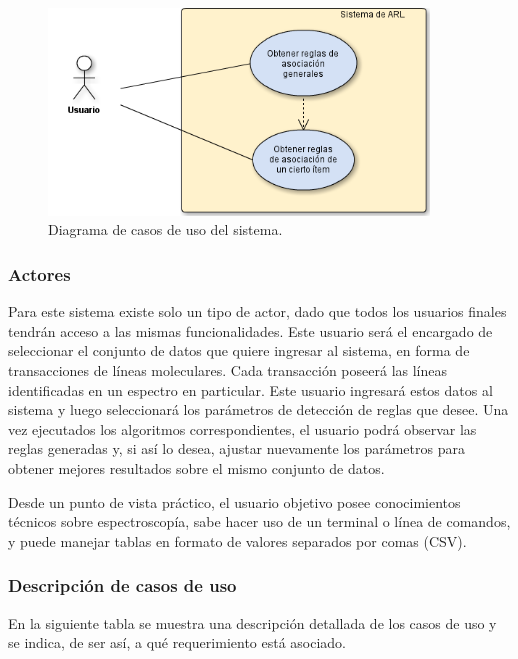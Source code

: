 \begin{figure}[h!]
\begin{center}
\includegraphics[width=0.9\textwidth]{imagenes/casos_de_uso.png}
\end{center}
\vspace*{-5mm}
\caption{Diagrama de casos de uso del sistema.}
\label{fig:cases}
\end{figure}

\subsubsection{Actores}

Para este sistema existe solo un tipo de actor, dado que todos los usuarios finales tendrán acceso a las mismas funcionalidades. Este usuario será el encargado de seleccionar el conjunto de datos que quiere ingresar al sistema, en forma de transacciones de líneas moleculares. Cada transacción poseerá las líneas identificadas en un espectro en particular. Este usuario ingresará estos datos al sistema y luego seleccionará los parámetros de detección de reglas que desee. Una vez ejecutados los algoritmos correspondientes, el usuario podrá observar las reglas generadas y, si así lo desea, ajustar nuevamente los parámetros para obtener mejores resultados sobre el mismo conjunto de datos.

Desde un punto de vista práctico, el usuario objetivo posee conocimientos técnicos sobre espectroscopía, sabe hacer uso de un terminal o línea de comandos, y puede manejar tablas en formato de valores separados por comas (CSV).


\subsubsection{Descripción de casos de uso}

En la siguiente tabla se muestra una descripción detallada de los casos de uso y se indica, de ser así, a qué requerimiento está asociado.

